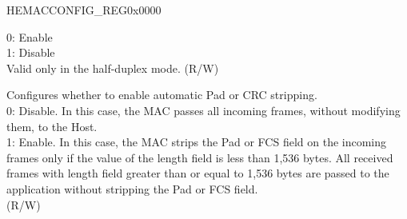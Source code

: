 \begin{register}{H}{EMACCONFIG\_REG}{0x0000}
\begin{regdesc}
\begin{reglist}
0: Enable\\
1: Disable\\
Valid only in the half-duplex mode. (R/W)
\item [EMACPADCRCSTRIP]
Configures whether to enable automatic Pad or CRC stripping.\\
0: Disable. In this case, the MAC passes all incoming frames, without modifying them, to the Host.\\
1: Enable. In this case, the MAC strips the Pad or FCS field on the incoming frames only if the value of the length field is less than 1,536 bytes. All received frames with length field greater than or equal to 1,536 bytes are passed to the application without stripping the Pad or FCS field.\\ (R/W)

\item[Continued on the next page...]
\end{reglist}\end{regdesc}
\end{register}

